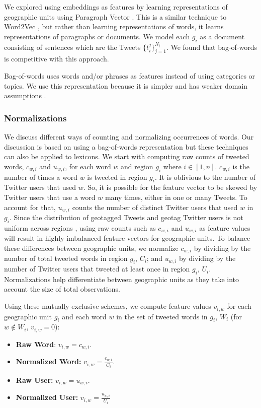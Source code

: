 \documentclass[letterpaper]{article}
\begin{document}
We explored using embeddings as features by learning representations of geographic units using Paragraph Vector \cite{le2014distributed}. This is a similar technique to Word2Vec \cite{mikolov2013distributed}, but rather than learning representations of words, it learns representations of paragraphs or documents. We model each $g_i$ as a document consisting of sentences which are the Tweets $\{t_i^j\}_{j=1}^{N_i}$. We found that bag-of-words is competitive with this approach.

Bag-of-words uses words and/or phrases as features instead of using categories or topics. We use this representation because it is simpler and has weaker domain assumptions \cite{o2011computational}. 

\subsubsection{Normalizations} We discuss different ways of counting and normalizing occurrences of words. Our discussion is based on using a bag-of-words representation but these techniques can also be applied to lexicons. We start with computing raw counts of tweeted words, $c_{w,i}$ and $u_{w,i}$, for each word $w$ and region $g_i$ where $i \in [1,n]$. $c_{w,i}$ is the number of times a word $w$ is tweeted in region $g_i$. It is oblivious to the number of Twitter users that used $w$. So, it is possible for the feature vector to be skewed by Twitter users that use a word $w$ many times, either in one or many Tweets. To account for that, $u_{w,i}$ counts the number of distinct Twitter users that used $w$ in $g_i$. Since the distribution of geotagged Tweets and geotag Twitter users is not uniform across regions \cite{malik2015population}, using raw counts such as $c_{w,i}$ and $u_{w,i}$ as feature values will result in highly imbalanced feature vectors for geographic units. To balance these differences between geographic units, we normalize $c_{w,i}$ by dividing by the number of total tweeted words in region $g_i$, $C_i$; and $u_{w,i}$ by dividing by the number of Twitter users that tweeted at least once in region $g_i$, $U_i$. Normalizations help differentiate between geographic units as they take into account the size of total observations. 

Using these mutually exclusive schemes, we compute feature values $v_{i,w}$ for each geographic unit $g_i$ and each word $w$ in the set of tweeted words in $g_i$, $W_i$ (for $w \notin W_i$, $v_{i,w} = 0$):
\begin{itemize}
\item \textbf{Raw Word}: $v_{i,w} = c_{w,i}$.
\item \textbf{Normalized Word:} $v_{i,w} = \frac{c_{w,i}}{C_i}$.
\item \textbf{Raw User:} $v_{i,w} = u_{w,i}$.
\item \textbf{Normalized User:} $v_{i,w} = \frac{u_{w,i}}{U_i}$
\end{itemize}
\end{document}

